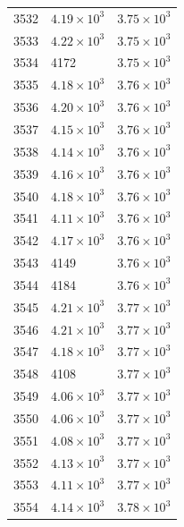 \begin{table}[H]
\begin{tabular}{lll}
3532 & $\displaystyle 4.19 \times 10^{3}$ & $\displaystyle 3.75 \times 10^{3}$ \\
3533 & $\displaystyle 4.22 \times 10^{3}$ & $\displaystyle 3.75 \times 10^{3}$ \\
3534 & 4172 & $\displaystyle 3.75 \times 10^{3}$ \\
3535 & $\displaystyle 4.18 \times 10^{3}$ & $\displaystyle 3.76 \times 10^{3}$ \\
3536 & $\displaystyle 4.20 \times 10^{3}$ & $\displaystyle 3.76 \times 10^{3}$ \\
3537 & $\displaystyle 4.15 \times 10^{3}$ & $\displaystyle 3.76 \times 10^{3}$ \\
3538 & $\displaystyle 4.14 \times 10^{3}$ & $\displaystyle 3.76 \times 10^{3}$ \\
3539 & $\displaystyle 4.16 \times 10^{3}$ & $\displaystyle 3.76 \times 10^{3}$ \\
3540 & $\displaystyle 4.18 \times 10^{3}$ & $\displaystyle 3.76 \times 10^{3}$ \\
3541 & $\displaystyle 4.11 \times 10^{3}$ & $\displaystyle 3.76 \times 10^{3}$ \\
3542 & $\displaystyle 4.17 \times 10^{3}$ & $\displaystyle 3.76 \times 10^{3}$ \\
3543 & 4149 & $\displaystyle 3.76 \times 10^{3}$ \\
3544 & 4184 & $\displaystyle 3.76 \times 10^{3}$ \\
3545 & $\displaystyle 4.21 \times 10^{3}$ & $\displaystyle 3.77 \times 10^{3}$ \\
3546 & $\displaystyle 4.21 \times 10^{3}$ & $\displaystyle 3.77 \times 10^{3}$ \\
3547 & $\displaystyle 4.18 \times 10^{3}$ & $\displaystyle 3.77 \times 10^{3}$ \\
3548 & 4108 & $\displaystyle 3.77 \times 10^{3}$ \\
3549 & $\displaystyle 4.06 \times 10^{3}$ & $\displaystyle 3.77 \times 10^{3}$ \\
3550 & $\displaystyle 4.06 \times 10^{3}$ & $\displaystyle 3.77 \times 10^{3}$ \\
3551 & $\displaystyle 4.08 \times 10^{3}$ & $\displaystyle 3.77 \times 10^{3}$ \\
3552 & $\displaystyle 4.13 \times 10^{3}$ & $\displaystyle 3.77 \times 10^{3}$ \\
3553 & $\displaystyle 4.11 \times 10^{3}$ & $\displaystyle 3.77 \times 10^{3}$ \\
3554 & $\displaystyle 4.14 \times 10^{3}$ & $\displaystyle 3.78 \times 10^{3}$ \\

\end{tabular}
\end{table}
